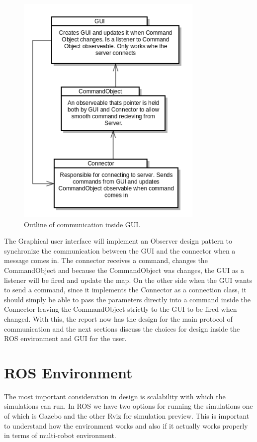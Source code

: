         \begin{figure}[!ht]  
            \centering
              \includegraphics[width=0.8\textwidth]{figures/GUICommunication.png}
              \caption{Outline of communication inside GUI.}
          \end{figure}

        The Graphical user interface will implement an Observer design pattern to synchronize the communication between the GUI and the connector when a message comes in. The connector receives a command, changes the CommandObject and because the CommandObject was changes, the GUI as a listener will be fired and update the map. On the other side when the GUI wants to send a command, since it implements the Connector as a connection class, it should simply be able to pass the parameters directly into a command inside the Connector leaving the CommandObject strictly to the GUI to be fired when changed. With this, the report now has the design for the main protocol of communication and the next sections discuss the choices for design inside the ROS environment and GUI for the user.

    \section{ROS Environment}
      The most important consideration in design is scalability with which the simulations can run. In ROS we have two options for running the simulations one of which is Gazebo and the other Rviz for simulation preview. This is important to understand how the environment works and also if it actually works properly in terms of multi-robot environment.

